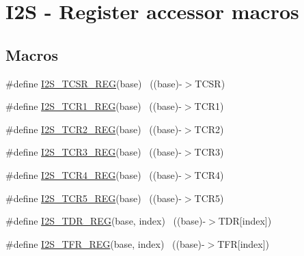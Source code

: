 \hypertarget{group___i2_s___register___accessor___macros}{}\section{I2S -\/ Register accessor macros}
\label{group___i2_s___register___accessor___macros}
\subsection*{Macros}
\begin{DoxyCompactItemize}
\item 
\#define \hyperlink{group___i2_s___register___accessor___macros_gacffda7930e76dbbaf37eaa2e5392a3da}{I2\+S\+\_\+\+T\+C\+S\+R\+\_\+\+R\+EG}(base)                                          ~((base)-\/$>$T\+C\+SR)
\item 
\#define \hyperlink{group___i2_s___register___accessor___macros_ga13c61275025dc7fbdca74ac8b98b0307}{I2\+S\+\_\+\+T\+C\+R1\+\_\+\+R\+EG}(base)                                          ~((base)-\/$>$T\+C\+R1)
\item 
\#define \hyperlink{group___i2_s___register___accessor___macros_ga5fb00e617bbbfcd3b1cce3ad6bdb656d}{I2\+S\+\_\+\+T\+C\+R2\+\_\+\+R\+EG}(base)                                          ~((base)-\/$>$T\+C\+R2)
\item 
\#define \hyperlink{group___i2_s___register___accessor___macros_ga522cedd1600fdaaa70c581dfc1f624ea}{I2\+S\+\_\+\+T\+C\+R3\+\_\+\+R\+EG}(base)                                          ~((base)-\/$>$T\+C\+R3)
\item 
\#define \hyperlink{group___i2_s___register___accessor___macros_ga3ca290e5e99bb9ca130ff9eb2980ab95}{I2\+S\+\_\+\+T\+C\+R4\+\_\+\+R\+EG}(base)                                          ~((base)-\/$>$T\+C\+R4)
\item 
\#define \hyperlink{group___i2_s___register___accessor___macros_gad75c8d22ba5ae3b82a7d2251cc70a77b}{I2\+S\+\_\+\+T\+C\+R5\+\_\+\+R\+EG}(base)                                          ~((base)-\/$>$T\+C\+R5)
\item 
\#define \hyperlink{group___i2_s___register___accessor___macros_ga87e46bded71d5375c77dbe4f93f1fc5c}{I2\+S\+\_\+\+T\+D\+R\+\_\+\+R\+EG}(base,  index)                                ~((base)-\/$>$T\+DR\mbox{[}index\mbox{]})
\item 
\#define \hyperlink{group___i2_s___register___accessor___macros_ga836a44a99ae9077cdf8909db381b6b68}{I2\+S\+\_\+\+T\+F\+R\+\_\+\+R\+EG}(base,  index)                                ~((base)-\/$>$T\+FR\mbox{[}index\mbox{]})

\end{DoxyCompactItemize}
